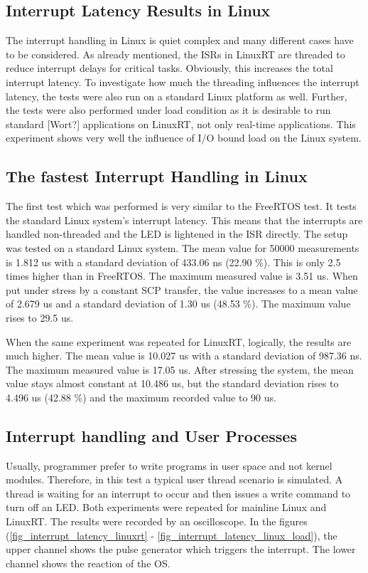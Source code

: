 \subsection{Interrupt Latency Results in Linux}\label{ss_interrupt_latency_results_in_linux}
The interrupt handling in Linux is quiet complex and many different cases have to be considered. 
As already mentioned, the \acp{ISR} in LinuxRT are threaded to reduce interrupt delays for critical tasks. 
Obviously, this increases the total interrupt latency.
To investigate how much the threading influences the interrupt latency, the tests were also run on a standard Linux platform as well.
Further, the tests were also performed under load condition as it is desirable to run standard [Wort?] applications on LinuxRT, not only real-time applications. 
This experiment shows very well the influence of \ac{I/O} bound load on the Linux system.

\subsection{The fastest Interrupt Handling in Linux}
The first test which was performed is very similar to the FreeRTOS test. 
It tests the standard Linux system's interrupt latency.
This means that the interrupts are handled non-threaded and the \ac{LED} is lightened in the \ac{ISR} directly.
The setup was tested on a standard Linux system.
The mean value for 50000 measurements is 1.812 us with a standard deviation of 433.06 ns (22.90 \%). 
This is only 2.5 times higher than in FreeRTOS. 
The maximum measured value is 3.51 us.
When put under stress by a constant SCP transfer, the value increases to a mean value of 2.679 us and a standard deviation of 1.30 us (48.53 \%).
The maximum value rises to 29.5 us.
\par
When the same experiment was repeated for LinuxRT, logically, the results are much higher.
The mean value is 10.027 us with a standard deviation of 987.36 ns. 
The maximum measured value is 17.05 us.
After stressing the system, the mean value stays almost constant at 10.486 us, but the standard deviation rises to 4.496 us (42.88 \%) and the maximum recorded value to 90 us.

\subsection{Interrupt handling and User Processes}
Usually, programmer prefer to write programs in user space and not kernel modules. 
Therefore, in this test a typical user thread scenario is simulated.
A thread is waiting for an interrupt to occur and then issues a write command to turn off an \ac{LED}. 
Both experiments were repeated for mainline Linux and LinuxRT. 
The results were recorded by an oscilloscope.
In the figures (\ref{fig_interrupt_latency_linuxrt} - \ref{fig_interrupt_latency_linux_load}), the upper channel shows the pulse generator which triggers the interrupt.
The lower channel shows the reaction of the \ac{OS}.  


